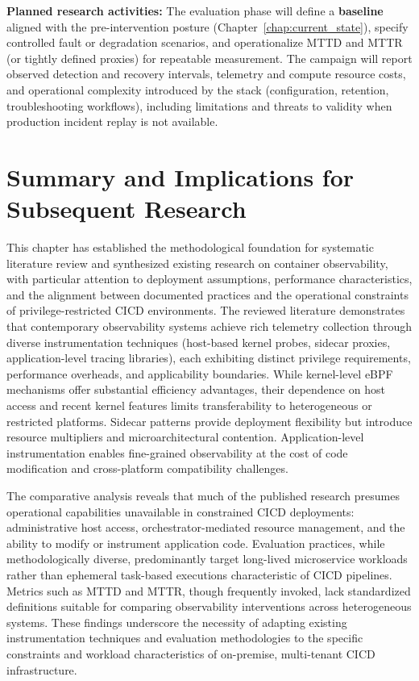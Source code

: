 \textbf{Planned research activities:} The evaluation phase will define a \textbf{baseline} aligned with the pre-intervention posture (Chapter~\ref{chap:current_state}), specify controlled fault or degradation scenarios, and operationalize \ac{MTTD} and \ac{MTTR} (or tightly defined proxies) for repeatable measurement. The campaign will report observed detection and recovery intervals, telemetry and compute resource costs, and operational complexity introduced by the stack (configuration, retention, troubleshooting workflows), including limitations and threats to validity when production incident replay is not available.


\section{Summary and Implications for Subsequent Research}
\label{sec:chapter2-summary}

This chapter has established the methodological foundation for systematic literature review and synthesized existing research on container observability, with particular attention to deployment assumptions, performance characteristics, and the alignment between documented practices and the operational constraints of privilege-restricted \ac{CICD} environments. The reviewed literature demonstrates that contemporary observability systems achieve rich telemetry collection through diverse instrumentation techniques (host-based kernel probes, sidecar proxies, application-level tracing libraries), each exhibiting distinct privilege requirements, performance overheads, and applicability boundaries. While kernel-level \gls{eBPF} mechanisms offer substantial efficiency advantages, their dependence on host access and recent kernel features limits transferability to heterogeneous or restricted platforms. Sidecar patterns provide deployment flexibility but introduce resource multipliers and microarchitectural contention. Application-level instrumentation enables fine-grained observability at the cost of code modification and cross-platform compatibility challenges.

The comparative analysis reveals that much of the published research presumes operational capabilities unavailable in constrained \ac{CICD} deployments: administrative host access, orchestrator-mediated resource management, and the ability to modify or instrument application code. Evaluation practices, while methodologically diverse, predominantly target long-lived microservice workloads rather than ephemeral task-based executions characteristic of \ac{CICD} pipelines. Metrics such as \gls{MTTD} and \gls{MTTR}, though frequently invoked, lack standardized definitions suitable for comparing observability interventions across heterogeneous systems. These findings underscore the necessity of adapting existing instrumentation techniques and evaluation methodologies to the specific constraints and workload characteristics of on-premise, multi-tenant \ac{CICD} infrastructure.

